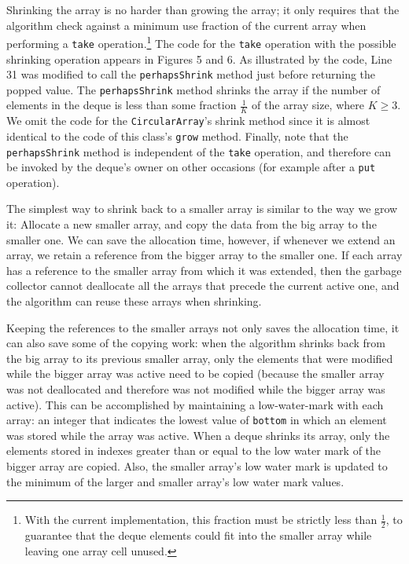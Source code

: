Shrinking the array is no harder than growing the array; it only
requires that the algorithm check against a minimum use fraction of
the current array when performing a \lstinline!take!
operation.\footnote{With the current implementation, this fraction
  must be strictly less than $\frac{1}{2}$, to guarantee that the
  deque elements could fit into the smaller array while leaving one
  array cell unused.} The code for the \lstinline!take!
operation with the possible shrinking operation appears in Figures 5
and 6. As illustrated by the code, Line 31 was modified to call the
\lstinline!perhapsShrink! method just before returning the popped
value. The \lstinline!perhapsShrink! method shrinks the array if the
number of elements in the deque is less than some fraction
$\frac{1}{K}$ of the array size, where $K \ge 3$. We omit the code for
the \lstinline!CircularArray!'s shrink method since it is almost
identical to the code of this class's \lstinline!grow! method.
Finally, note that the \lstinline!perhapsShrink! method is independent
of the \lstinline!take! operation, and therefore can be invoked
by the deque's owner on other occasions (for example after a
\lstinline!put! operation).


The simplest way to shrink back to a smaller array is similar to the
way we grow it: Allocate a new smaller array, and copy the data from
the big array to the smaller one. We can save the allocation time,
however, if whenever we extend an array, we retain a reference from
the bigger array to the smaller one. If each array has a reference to
the smaller array from which it was extended, then the garbage
collector cannot deallocate all the arrays that precede the current
active one, and the algorithm can reuse these arrays when shrinking.

Keeping the references to the smaller arrays not only saves the
allocation time, it can also save some of the copying work: when the
algorithm shrinks back from the big array to its previous smaller
array, only the elements that were modified while the bigger array was
active need to be copied (because the smaller array was not
deallocated and therefore was not modified while the bigger array was
active). This can be accomplished by maintaining a low-water-mark with
each array: an integer that indicates the lowest value of
\lstinline!bottom! in which an element was stored while the array was
active. When a deque shrinks its array, only the elements stored in
indexes greater than or equal to the low water mark of the bigger
array are copied. Also, the smaller array's low water mark is updated
to the minimum of the larger and smaller array's low water mark
values.

